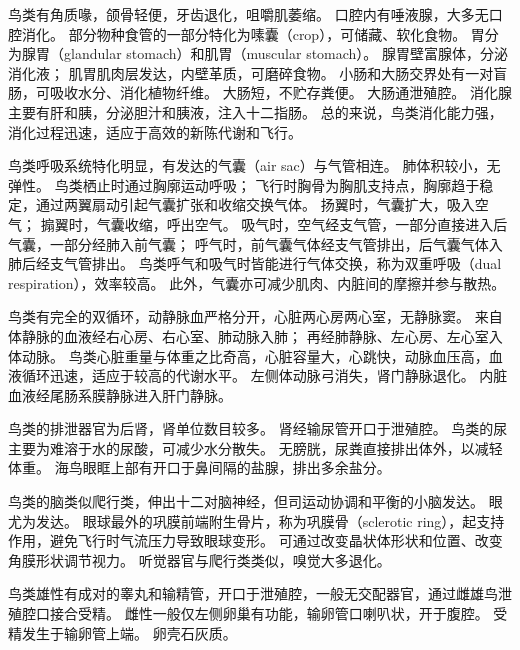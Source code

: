\documentclass[11pt]{article}
\begin{document}
\newline

鸟类有角质喙，颌骨轻便，牙齿退化，咀嚼肌萎缩。
口腔内有唾液腺，大多无口腔消化。
部分物种食管的一部分特化为嗉囊（crop），可储藏、软化食物。
胃分为腺胃（glandular stomach）和肌胃（muscular stomach）。
腺胃壁富腺体，分泌消化液；
肌胃肌肉层发达，内壁革质，可磨碎食物。
小肠和大肠交界处有一对盲肠，可吸收水分、消化植物纤维。
大肠短，不贮存粪便。
大肠通泄殖腔。
消化腺主要有肝和胰，分泌胆汁和胰液，注入十二指肠。
总的来说，鸟类消化能力强，消化过程迅速，适应于高效的新陈代谢和飞行。

\newline

鸟类呼吸系统特化明显，有发达的气囊（air sac）与气管相连。
肺体积较小，无弹性。
鸟类栖止时通过胸廓运动呼吸；
飞行时胸骨为胸肌支持点，胸廓趋于稳定，通过两翼扇动引起气囊扩张和收缩交换气体。
扬翼时，气囊扩大，吸入空气；
搧翼时，气囊收缩，呼出空气。
吸气时，空气经支气管，一部分直接进入后气囊，一部分经肺入前气囊；
呼气时，前气囊气体经支气管排出，后气囊气体入肺后经支气管排出。
鸟类呼气和吸气时皆能进行气体交换，称为双重呼吸（dual respiration），效率较高。
此外，气囊亦可减少肌肉、内脏间的摩擦并参与散热。

\newline

鸟类有完全的双循环，动静脉血严格分开，心脏两心房两心室，无静脉窦。
来自体静脉的血液经右心房、右心室、肺动脉入肺；
再经肺静脉、左心房、左心室入体动脉。
鸟类心脏重量与体重之比奇高，心脏容量大，心跳快，动脉血压高，血液循环迅速，适应于较高的代谢水平。
左侧体动脉弓消失，肾门静脉退化。
内脏血液经尾肠系膜静脉进入肝门静脉。

\newline

鸟类的排泄器官为后肾，肾单位数目较多。
肾经输尿管开口于泄殖腔。
鸟类的尿主要为难溶于水的尿酸，可减少水分散失。
无膀胱，尿粪直接排出体外，以减轻体重。
海鸟眼眶上部有开口于鼻间隔的盐腺，排出多余盐分。

\newline

鸟类的脑类似爬行类，伸出十二对脑神经，但司运动协调和平衡的小脑发达。
眼尤为发达。
眼球最外的巩膜前端附生骨片，称为巩膜骨（sclerotic ring），起支持作用，避免飞行时气流压力导致眼球变形。
可通过改变晶状体形状和位置、改变角膜形状调节视力。
听觉器官与爬行类类似，嗅觉大多退化。

\newline

鸟类雄性有成对的睾丸和输精管，开口于泄殖腔，一般无交配器官，通过雌雄鸟泄殖腔口接合受精。
雌性一般仅左侧卵巢有功能，输卵管口喇叭状，开于腹腔。
受精发生于输卵管上端。
卵壳石灰质。
\end{document}
